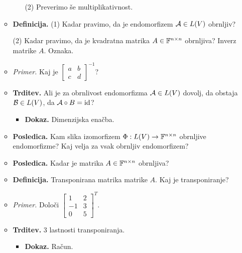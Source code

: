 \begin{enumerate}
\begin{itemize}
\begin{itemize}
            (2) Preverimo še multiplikativnost.
        \end{itemize}  
        \item \colorbox{purple!30}{\textbf{Definicija.}} (1) Kadar pravimo, da je endomorfizem $\mathcal{A} \in L(V)$ obrnljiv?
        
        (2) Kadar pravimo, da je kvadratna matrika $A \in \mathbb{F}^{n \times n}$ obrnljiva? Inverz matrike $A$. Oznaka.
        \item \colorbox{yellow!30}{\emph{Primer.}} Kaj je $\begin{bmatrix}
            a & b \\ c & d
        \end{bmatrix}^{-1}$? 
        \item \colorbox{blue!30}{\textbf{Trditev.}} Ali je za obrnlivost endomorfizma $\mathcal{A} \in L(V)$ dovolj, da obstaja $\mathcal{B} \in L(V)$, da $\mathcal{A} \circ B = \operatorname{id}$?
        \begin{itemize}
            \item \colorbox{green!30}{\textbf{Dokaz.}} Dimenzijska enačba.
        \end{itemize}  
        \item \colorbox{orange!30}{\textbf{Posledica.}} Kam slika izomorfizem $\Phi: L(V) \to \mathbb{F}^{n \times n}$ obrnljive endomorfizme? Kaj velja za vsak obrnljiv endomorfizem?
        \item \colorbox{orange!30}{\textbf{Posledica.}} Kadar je matrika $A \in \mathbb{F}^{n \times n}$ obrnljiva?
        \item \colorbox{purple!30}{\textbf{Definicija.}} Transponirana matrika matrike $A$. Kaj je transponiranje?
        \item \colorbox{yellow!30}{\emph{Primer.}} Določi $\begin{bmatrix}
            1 & 2 \\ -1 & 3 \\ 0 & 5
        \end{bmatrix}^T$.
        \item \colorbox{blue!30}{\textbf{Trditev.}} 3 lastnosti transponiranja.
        \begin{itemize}
            \item \colorbox{green!30}{\textbf{Dokaz.}} Račun.
        \end{itemize}
    \end{itemize}


\end{enumerate}
